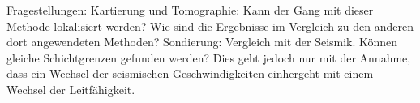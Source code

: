 Fragestellungen:
Kartierung und Tomographie: Kann der Gang mit dieser Methode lokalisiert werden? Wie sind die Ergebnisse im Vergleich zu den anderen dort angewendeten Methoden?
Sondierung: Vergleich mit der Seismik. Können gleiche Schichtgrenzen gefunden werden? Dies geht jedoch nur mit der Annahme, dass ein Wechsel der seismischen Geschwindigkeiten einhergeht mit einem Wechsel der Leitfähigkeit.